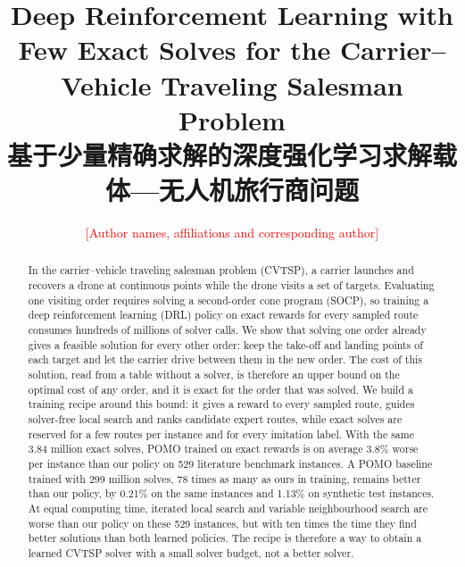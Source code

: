 \documentclass[preprint,12pt,authoryear]{elsarticle}
\newcommand{\placeholder}[1]{\textcolor{red}{[#1]}}
\begin{document}
\begin{frontmatter}

\title{Deep Reinforcement Learning with Few Exact Solves for the Carrier--Vehicle Traveling Salesman Problem\\[6pt]{\large 基于少量精确求解的深度强化学习求解载体—无人机旅行商问题}}

\author{\placeholder{Author names, affiliations and corresponding author}}

\begin{abstract}
In the carrier--vehicle traveling salesman problem (CVTSP), a carrier launches and recovers a drone at continuous points while the drone visits a set of targets. Evaluating one visiting order requires solving a second-order cone program (SOCP), so training a deep reinforcement learning (DRL) policy on exact rewards for every sampled route consumes hundreds of millions of solver calls. We show that solving one order already gives a feasible solution for every other order: keep the take-off and landing points of each target and let the carrier drive between them in the new order. The cost of this solution, read from a table without a solver, is therefore an upper bound on the optimal cost of any order, and it is exact for the order that was solved. We build a training recipe around this bound: it gives a reward to every sampled route, guides solver-free local search and ranks candidate expert routes, while exact solves are reserved for a few routes per instance and for every imitation label. With the same 3.84 million exact solves, POMO trained on exact rewards is on average 3.8\% worse per instance than our policy on 529 literature benchmark instances. A POMO baseline trained with 299 million solves, 78 times as many as ours in training, remains better than our policy, by 0.21\% on the same instances and 1.13\% on synthetic test instances. At equal computing time, iterated local search and variable neighbourhood search are worse than our policy on these 529 instances, but with ten times the time they find better solutions than both learned policies. The recipe is therefore a way to obtain a learned CVTSP solver with a small solver budget, not a better solver.


\end{abstract}
\end{frontmatter}
\end{document}
